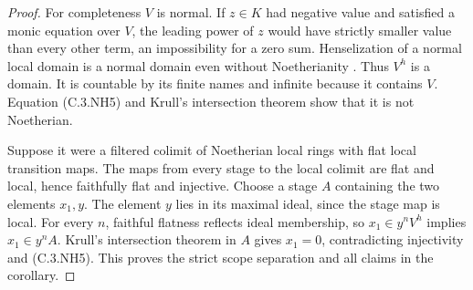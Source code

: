 \begin{proof}
For completeness $V$ is
normal.  If $z\in K$ had
negative value and satisfied
a monic equation over $V$,
the leading power of $z$
would have strictly smaller
value than every other
term, an impossibility
for a zero sum.
Henselization of a normal
local domain is a normal
domain even without
Noetherianity
\cite[Lemma 15.46.6, Tag 07QL]
 {C-StacksCoherentHenselizations}.
Thus $V^h$ is a domain.
It is countable by its
finite names and infinite
because it contains $V$.
Equation (C.3.NH5) and
Krull's intersection theorem
\cite[Lemma 10.51.4, Tag 00IP]
 {C-StacksCoherentHenselizations}
show that it is not
Noetherian.

Suppose it were a filtered
colimit of Noetherian local
rings with flat local
transition maps.
The maps from every stage
to the local colimit are
flat and local, hence
faithfully flat and
injective.  Choose a
stage $A$ containing
the two elements $x_1,y$.
The element $y$ lies
in its maximal ideal,
since the stage map
is local.
For every $n$, faithful
flatness reflects ideal
membership, so
$x_1\in y^nV^h$ implies
$x_1\in y^nA$.
Krull's intersection
theorem in $A$ gives
$x_1=0$, contradicting
injectivity and (C.3.NH5).
This proves the strict
scope separation and all
claims in the corollary.
\end{proof}
